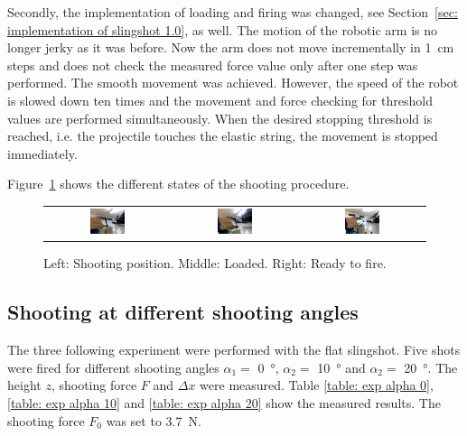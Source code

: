 			Secondly, the implementation of loading and firing was changed, see Section~\ref{sec: implementation of slingshot 1.0}, as well. The motion of the robotic arm is no longer jerky as it was before. Now the arm does not move incrementally in \SI{1}{cm} steps and does not check the measured force value only after one step was performed.  The smooth movement was achieved. However, the speed of the robot is slowed down ten times and the movement and force checking for threshold values are performed simultaneously. When the desired stopping threshold is reached, i.e. the projectile touches the elastic string, the movement is stopped immediately.

			Figure~\ref{fig: shooting process 2.0} shows the different states of the shooting procedure.

			\begin{figure}[h]
			\centering
			\begin{tabular}{ccc}
			\includegraphics[width=0.3\textwidth]{shooting_posAdj.png}
			&
			\includegraphics[width=0.3\textwidth]{loadAdj.png}
			&
			\includegraphics[width=0.3\textwidth]{fireAdj.png}
			\end{tabular}
			\caption{Left: Shooting position. Middle: Loaded. Right: Ready to fire.}
			\label{fig: shooting process 2.0}
			\end{figure}

		\subsection{Shooting at different shooting angles}
			The three following experiment were performed with the flat slingshot. Five shots were fired for different shooting angles $ \alpha_{1} = $ \SI{0}{\degree}, $ \alpha_{2} = $ \SI{10}{\degree} and $ \alpha_{2} = $ \SI{20}{\degree}. The height $ z $, shooting force $F$ and $\Delta x$ were measured. Table \ref{table: exp alpha 0}, \ref{table: exp alpha 10} and \ref{table: exp alpha 20} show the measured results. The shooting force $F_0$ was set to \SI{3.7}{N}.


